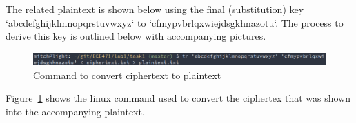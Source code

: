 \documentclass[12pt]{article}
\begin{document}
The related plaintext is shown below using the final (substitution) key `abcdefghijklmnopqrstuvwxyz` to `cfmypvbrlqxwiejdsgkhnazotu`. The process to derive this key is outlined below with accompanying pictures.

\begin{figure}[H]
    \begin{center}
        \includegraphics[scale=0.5]{c23.png}
    \end{center}{}
    \caption{Command to convert ciphertext to plaintext}
    \label{fig:c23}
\end{figure}

Figure~\ref{fig:c23} shows the linux command used to convert the ciphertex that was shown into the accompanying plaintext.
\end{document}
